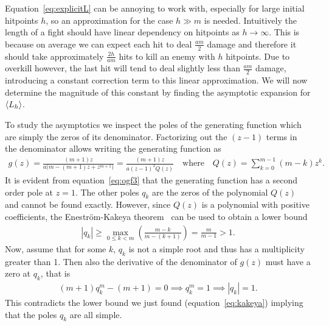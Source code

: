 Equation~\ref{eq:explicitL} can be annoying to work with, especially for large initial hitpoints $h$, so an approximation for the case $h \gg m$ is needed. Intuitively the length of a fight should have linear dependency on hitpoints as $h \rightarrow \infty$. This is because on average we can expect each hit to deal $\frac{am}{2}$ damage and therefore it should take approximately $\frac{2h}{am}$ hits to kill an enemy with $h$ hitpoints. Due to overkill however, the last hit will tend to deal slightly less than $\frac{am}{2}$ damage, introducing a constant correction term to this linear approximation. We will now determine the magnitude of this constant by finding the asymptotic expansion for $\left\langle L_h \right\rangle$.

To study the asymptotics we inspect the poles of the generating function which are simply the zeros of its denominator. Factorizing out the $(z-1)$ terms in the denominator allows writing the generating function as
\begin{align}
	g(z)
		= \frac{(m+1)z}{a\big(m - (m+1)z + z^{m+1}\big)}
		= \frac{(m+1)z}{{a(z-1)}^2 Q(z)}
	\quad\mbox{where}\quad Q(z) = \sum_{k=0}^{m-1} (m-k) z^k\label{eq:ogf3}.
\end{align}
It is evident from equation~\ref{eq:ogf3} that the generating function has a second order pole at $z=1$. The other poles $q_k$ are the zeros of the polynomial $Q(z)$ and cannot be found exactly. However, since $Q(z)$ is a polynomial with positive coefficients, the Eneström-Kakeya theorem~\cite{kakeya} can be used to obtain a lower bound
\begin{align}
	|q_k|
		\geq \max\limits_{0\leq k < m} \left(\frac{m-k}{m-(k+1)}\right)
		= \frac{m}{m-1} > 1\label{eq:kakeya}.
\end{align}
Now, assume that for some $k$, $q_k$ is not a simple root and thus has a multiplicity greater than 1. Then also the derivative of the denominator of $g(z)$ must have a zero at $q_k$, that is
\begin{align*}
	(m+1)q_k^m - (m+1) = 0
	\implies q_k^m = 1
	\implies |q_k| = 1.
\end{align*}
This contradicts the lower bound we just found (equation~\ref{eq:kakeya}) implying that the poles $q_k$ are all simple.

